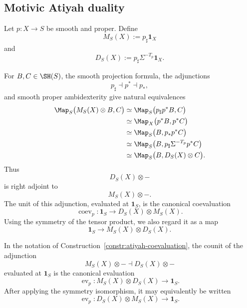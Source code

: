 \subsection{Motivic Atiyah duality}

Let \(p:X\to S\) be smooth and proper.  Define
\[
    M_S(X)
    :=
    p_\sharp\mathbf1_X
\]
and
\[
    D_S(X)
    :=
    p_\sharp\Sigma^{-T_p}\mathbf1_X.
\]

\begin{construction}[Coevaluation]
\label{constr:atiyah-coevaluation}
For \(B,C\in\SH(S)\), the smooth projection formula, the adjunctions
\[
    p_\sharp\dashv p^*\dashv p_*,
\]
and smooth proper ambidexterity give natural equivalences
\[
\begin{aligned}
    \Map_S
    \bigl(
      M_S(X)\otimes B,
      C
    \bigr)
    &\simeq
    \Map_S
    \bigl(
      p_\sharp p^*B,
      C
    \bigr) \\
    &\simeq
    \Map_X
    \bigl(
      p^*B,
      p^*C
    \bigr) \\
    &\simeq
    \Map_S
    \bigl(
      B,
      p_*p^*C
    \bigr) \\
    &\simeq
    \Map_S
    \bigl(
      B,
      p_\sharp\Sigma^{-T_p}p^*C
    \bigr) \\
    &\simeq
    \Map_S
    \bigl(
      B,
      D_S(X)\otimes C
    \bigr).
\end{aligned}
\]
Thus
\[
    D_S(X)\otimes-
\]
is right adjoint to
\[
    M_S(X)\otimes-.
\]
The unit of this adjunction, evaluated at \(\mathbf1_S\), is the canonical
coevaluation
\[
    \operatorname{coev}_p:
    \mathbf1_S
    \longrightarrow
    D_S(X)\otimes M_S(X).
\]
Using the symmetry of the tensor product, we also regard it as a map
\[
    \mathbf1_S
    \longrightarrow
    M_S(X)\otimes D_S(X).
\]
\end{construction}

\begin{construction}[Evaluation]
\label{constr:atiyah-evaluation}
In the notation of
Construction~\ref{constr:atiyah-coevaluation}, the counit of the adjunction
\[
    M_S(X)\otimes-
    \dashv
    D_S(X)\otimes-
\]
evaluated at \(\mathbf1_S\) is the canonical evaluation
\[
    \operatorname{ev}_p:
    M_S(X)\otimes D_S(X)
    \longrightarrow
    \mathbf1_S.
\]
After applying the symmetry isomorphism, it may equivalently be written
\[
    \operatorname{ev}_p:
    D_S(X)\otimes M_S(X)
    \longrightarrow
    \mathbf1_S.
\]
\end{construction}

